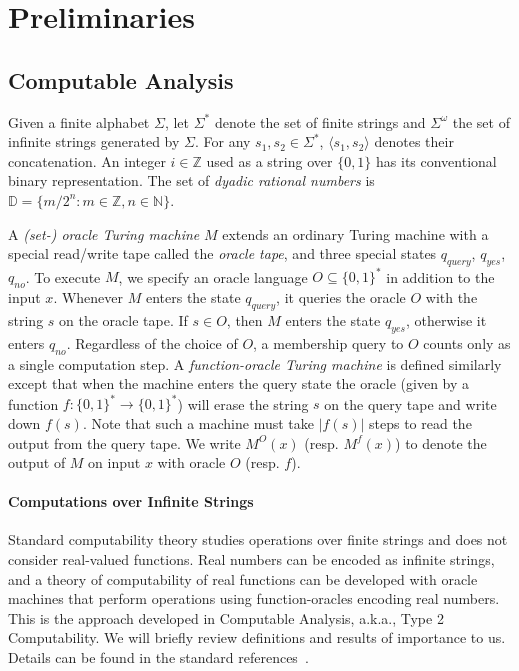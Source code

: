 \documentclass[prodmode]{acmsmall} %
\begin{document}
\section{Preliminaries}\label{pre}

\subsection{Computable Analysis}

Given a finite alphabet $\Sigma$, let $\Sigma^*$ denote the set of finite strings and $\Sigma^{\omega}$ the set of infinite strings generated by $\Sigma$. For any $s_1, s_2\in \Sigma^*$, $\langle s_1,s_2\rangle$ denotes their concatenation. An integer $i\in \mathbb{Z}$ used as a string over $\{0,1\}$ has its conventional binary representation. The set of {\em dyadic rational numbers} is $\mathbb{D} = \{m/2^n: m\in \mathbb{Z}, n\in \mathbb{N}\}$. 

A {\em (set-) oracle Turing machine} $M$ extends an ordinary Turing machine with a special read/write tape called the {\em oracle tape}, and three special states $q_{\mathit{query}}$, $q_{\mathit{yes}}$, $q_{\mathit{no}}$. To execute $M$, we specify an oracle language $O\subseteq \{0,1\}^*$ in addition to the input $x$. Whenever $M$ enters the state $q_{\mathit{query}}$, it queries the oracle $O$ with the string $s$ on the oracle tape. If $s\in O$, then $M$ enters the state $q_{\mathit{yes}}$, otherwise it enters $q_{\mathit{no}}$. Regardless of the choice of $O$, a membership query to $O$ counts only as a single computation step. A {\em function-oracle Turing machine} is defined similarly except that when the machine enters the query state the oracle (given by a function $f:\{0,1\}^*\rightarrow\{0,1\}^*$) will erase the string $s$ on the query tape and write down $f(s)$. Note that such a machine must take $|f(s)|$ steps to read the output from the query tape. We write $M^O(x)$ (resp. $M^f(x)$) to denote the output of $M$ on input $x$ with oracle $O$ (resp. $f$). 

\paragraph{Computations over Infinite Strings} Standard computability theory studies operations over finite strings and does not consider real-valued functions. Real numbers can be encoded as infinite strings, and a theory of computability of real functions can be developed with oracle machines that perform operations using function-oracles encoding real numbers. This is the approach developed in Computable Analysis, a.k.a., Type 2 Computability. We will briefly review definitions and results of importance to us. Details can be found in the standard references~\cite{CAbook,Kobook,vasco}.
\end{document}

